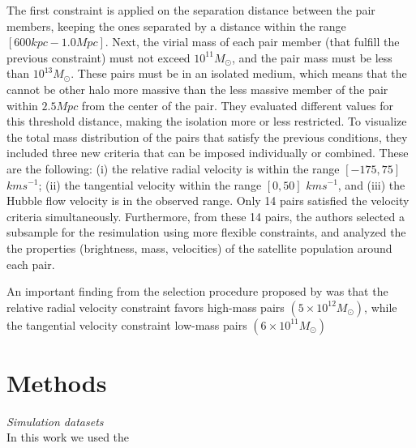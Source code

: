 \documentclass[fleqn,usenatbib]{mnras}
\begin{document}
The first constraint is applied on the separation distance between the pair members, keeping the ones separated by a distance within the range $[600kpc-1.0Mpc]$. Next, the virial mass of each pair member (that fulfill the previous constraint) must not exceed $10^{11} M_\odot$, and the pair mass must be less than $10^{13} M_\odot$. These pairs must be in an isolated medium, which means that the cannot be other halo more massive than the less massive member of the pair within $2.5Mpc$ from the center of the pair. They evaluated different values for this threshold distance, making the isolation more or less restricted. To visualize the total mass distribution of the pairs that satisfy the previous conditions, they included three new criteria that can be imposed individually or combined. These are the following: (i) the relative radial velocity is within the range $[-175,75]$ $kms^{-1}$; (ii) the tangential velocity within the range $[0,50]$ $kms^{-1}$, and (iii) the Hubble flow velocity is in the observed range. Only 14 pairs satisfied the velocity criteria simultaneously. Furthermore, from these 14 pairs, the authors selected a subsample for the resimulation using more flexible constraints, and analyzed the the properties (brightness, mass, velocities) of the satellite population around each pair.

An important finding from the selection procedure proposed by \cite{fattahi2016apostle} was that the relative radial velocity constraint favors high-mass pairs $(5\times 10^{12} M_\odot)$, while the tangential velocity constraint low-mass pairs $(6\times 10^{11} M_\odot)$










\section{Methods}
\textit{Simulation datasets}\\
In this work we used the 
\end{document}
